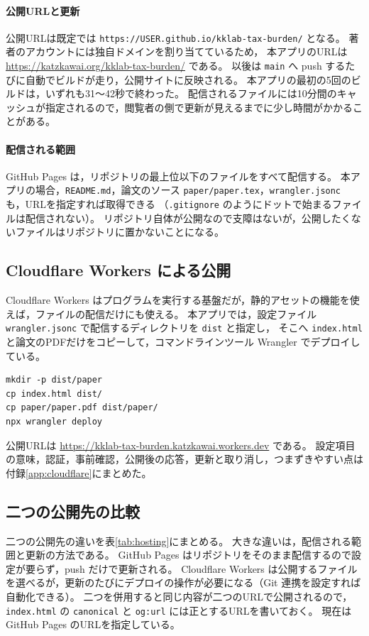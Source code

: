 \documentclass[paper=a4,fontsize=10pt]{jlreq}
\newcommand{\code}[1]{\texttt{#1}}
\begin{document}
\paragraph{公開URLと更新}
公開URLは既定では \code{https://USER.github.io/kklab-tax-burden/} となる。
著者のアカウントには独自ドメインを割り当てているため，
本アプリのURLは \url{https://katzkawai.org/kklab-tax-burden/} である。
以後は \code{main} へ push するたびに自動でビルドが走り，公開サイトに反映される。
本アプリの最初の5回のビルドは，いずれも31〜42秒で終わった。
配信されるファイルには10分間のキャッシュが指定されるので，閲覧者の側で更新が見えるまでに少し時間がかかることがある。

\paragraph{配信される範囲}
GitHub Pages は，リポジトリの最上位以下のファイルをすべて配信する。
本アプリの場合，\code{README.md}，論文のソース \code{paper/paper.tex}，\code{wrangler.jsonc} も，URLを指定すれば取得できる
（\code{.gitignore} のようにドットで始まるファイルは配信されない）。
リポジトリ自体が公開なので支障はないが，公開したくないファイルはリポジトリに置かないことになる。

\subsection{Cloudflare Workers による公開}

Cloudflare Workers はプログラムを実行する基盤だが，静的アセットの機能\cite{cfassets}を使えば，ファイルの配信だけにも使える。
本アプリでは，設定ファイル \code{wrangler.jsonc} で配信するディレクトリを \code{dist} と指定し，
そこへ \code{index.html} と論文のPDFだけをコピーして，コマンドラインツール Wrangler でデプロイしている。
\begin{lstlisting}
mkdir -p dist/paper
cp index.html dist/
cp paper/paper.pdf dist/paper/
npx wrangler deploy
\end{lstlisting}
公開URLは \url{https://kklab-tax-burden.katzkawai.workers.dev} である。
設定項目の意味，認証，事前確認，公開後の応答，更新と取り消し，つまずきやすい点は付録\ref{app:cloudflare}にまとめた。

\subsection{二つの公開先の比較}

二つの公開先の違いを表\ref{tab:hosting}にまとめる。
大きな違いは，配信される範囲と更新の方法である。
GitHub Pages はリポジトリをそのまま配信するので設定が要らず，push だけで更新される。
Cloudflare Workers は公開するファイルを選べるが，更新のたびにデプロイの操作が必要になる（Git 連携を設定すれば自動化できる）。
二つを併用すると同じ内容が二つのURLで公開されるので，
\code{index.html} の \code{canonical} と \code{og:url} には正とするURLを書いておく。
現在は GitHub Pages のURLを指定している。
\end{document}
